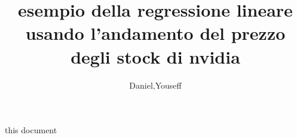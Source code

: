 \documentclass[12pt]{article}
\author{Daniel,Youseff}
\begin{document}
\title{esempio della regressione lineare usando l'andamento del prezzo degli stock di nvidia}
this document
\end{document}
